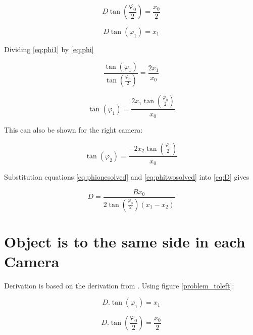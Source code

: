 
\begin{equation} \label{eq:phi}
D\tan\left(\frac{\varphi_{0}}{2}\right) = \frac{x_{0}}{2}
\end{equation}

\begin{equation} \label{eq:phi1}
D\tan(\varphi_1) = x_1
\end{equation}

Dividing \eqref{eq:phi1} by \eqref{eq:phi}

\begin{equation} \label{eq:tanovertan}
\frac{\tan(\varphi_1)}{\tan(\frac{\varphi_0}{2})} = \frac{2x_1}{x_0}
\end{equation}

\begin{equation} \label{eq:phionesolved}
\tan(\varphi_1) = \frac{2x_1\tan(\frac{\varphi_0}{2})}{x_0}
\end{equation}

This can also be shown for the right camera:

\begin{equation} \label{eq:phitwosolved}
\tan(\varphi_2) = \frac{-2x_2\tan(\frac{\varphi_0}{2})}{x_0}
\end{equation}

Substitution equations \eqref{eq:phionesolved} and \eqref{eq:phitwosolved} into \eqref{eq:D} gives

\begin{equation} \label{eq:Distance1}
D = \frac{Bx_0}{2\tan(\frac{\varphi_0}{2})(x_1 - x_2)}
\end{equation}


\section{Object is to the same side in each Camera}
Derivation is based on the derivation from \cite{DistanceEstimation}. Using figure \ref{problem_toleft}:

\begin{equation} \label{eq:p2:tanphi1}
D.\tan(\varphi_{1}) = x_{1}
\end{equation}

\begin{equation} \label{eq:p2:tanphi0}
D.\tan\left(\frac{\varphi_{0}}{2}\right) = \frac{x_{0}}{2}
\end{equation}

